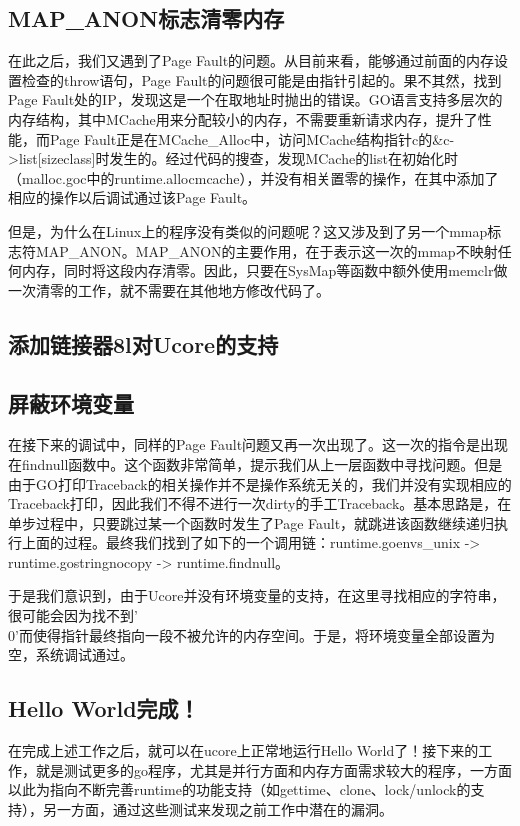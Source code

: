 \documentclass{article}
\begin{document}
\subsection{MAP\_ANON标志清零内存}
在此之后，我们又遇到了Page Fault的问题。从目前来看，能够通过前面的内存设置检查的throw语句，Page Fault的问题很可能是由指针引起的。果不其然，找到Page Fault处的IP，发现这是一个在取地址时抛出的错误。GO语言支持多层次的内存结构，其中MCache用来分配较小的内存，不需要重新请求内存，提升了性能，而Page Fault正是在MCache\_Alloc中，访问MCache结构指针c的\&c->list[sizeclass]时发生的。经过代码的搜查，发现MCache的list在初始化时（malloc.goc中的runtime.allocmcache），并没有相关置零的操作，在其中添加了相应的操作以后调试通过该Page Fault。

但是，为什么在Linux上的程序没有类似的问题呢？这又涉及到了另一个mmap标志符MAP\_ANON。MAP\_ANON的主要作用，在于表示这一次的mmap不映射任何内存，同时将这段内存清零。因此，只要在SysMap等函数中额外使用memclr做一次清零的工作，就不需要在其他地方修改代码了。

\subsection{添加链接器8l对Ucore的支持}

\subsection{屏蔽环境变量}
在接下来的调试中，同样的Page Fault问题又再一次出现了。这一次的指令是出现在findnull函数中。这个函数非常简单，提示我们从上一层函数中寻找问题。但是由于GO打印Traceback的相关操作并不是操作系统无关的，我们并没有实现相应的Traceback打印，因此我们不得不进行一次dirty的手工Traceback。基本思路是，在单步过程中，只要跳过某一个函数时发生了Page Fault，就跳进该函数继续递归执行上面的过程。最终我们找到了如下的一个调用链：runtime.goenvs\_unix -> runtime.gostringnocopy -> runtime.findnull。

于是我们意识到，由于Ucore并没有环境变量的支持，在这里寻找相应的字符串，很可能会因为找不到'\\0'而使得指针最终指向一段不被允许的内存空间。于是，将环境变量全部设置为空，系统调试通过。

\subsection{Hello World完成！}
在完成上述工作之后，就可以在ucore上正常地运行Hello World了！接下来的工作，就是测试更多的go程序，尤其是并行方面和内存方面需求较大的程序，一方面以此为指向不断完善runtime的功能支持（如gettime、clone、lock/unlock的支持），另一方面，通过这些测试来发现之前工作中潜在的漏洞。
\end{document}
